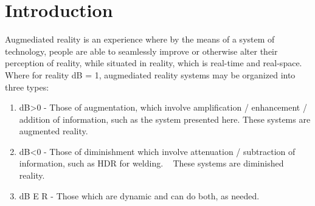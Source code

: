 \documentclass[conference]{sig-alternate-05-2015}
\begin{document}
\section{Introduction}
Augmediated reality is an experience where by the means of a system of technology, people are able to seamlessly improve or otherwise alter their perception of reality, while situated in reality, which is real-time and real-space. \\
Where for reality dB = 1, augmediated reality systems may be organized into three types: \\

\begin{enumerate}
\item dB\textgreater  0 - Those of augmentation, which involve amplification / enhancement / addition of information, such as the system presented here. These systems are augmented reality.
\item dB\textless  0 - Those of diminishment which involve attenuation / subtraction of information, such as HDR for welding. ~\cite{mannHDR} These systems are diminished reality.
\item dB E R - Those which are dynamic and can do both, as needed.
\end{enumerate}
\end{document}
